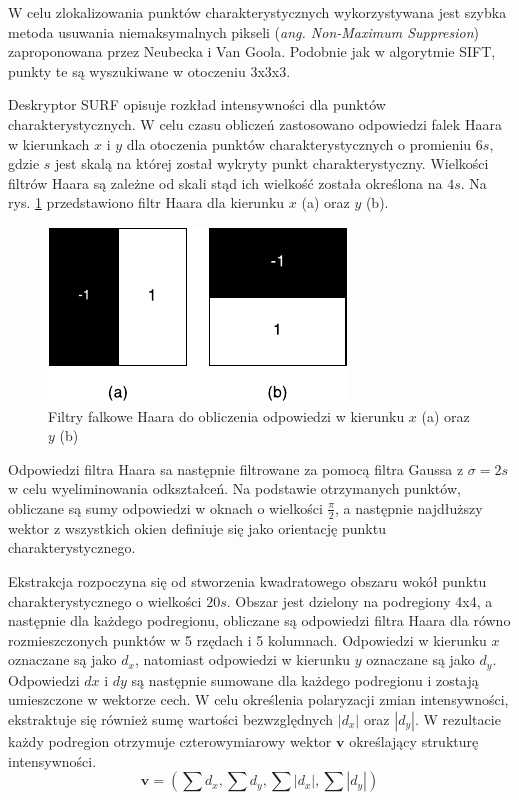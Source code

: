 W celu zlokalizowania punktów charakterystycznych wykorzystywana jest szybka metoda usuwania niemaksymalnych pikseli (\emph{ang. Non-Maximum Suppresion}) zaproponowana przez Neubecka i Van Goola\cite{NEUBECK06}. Podobnie jak w algorytmie SIFT, punkty te są wyszukiwane w otoczeniu 3x3x3.

Deskryptor SURF opisuje rozkład intensywności dla punktów charakterystycznych. W celu czasu obliczeń zastosowano odpowiedzi falek Haara w kierunkach $x$ i $y$ dla otoczenia punktów charakterystycznych o promieniu $6s$, gdzie $s$ jest skalą na której został wykryty punkt charakterystyczny. Wielkości filtrów Haara są zależne od skali stąd ich wielkość została określona na $4s$. Na rys. \ref{fig:surf-haar-wavelet} przedstawiono filtr Haara dla kierunku $x$ (a) oraz $y$ (b).

\begin{figure}[h]
	\centering
	\includegraphics[scale=1.5]{graphics/01_podstawy_teoretyczne/surf-haar-wavelet.pdf}
	\caption{Filtry falkowe Haara do obliczenia odpowiedzi w kierunku $x$ (a) oraz $y$ (b) \cite{BAY08}}
	\label{fig:surf-haar-wavelet}
\end{figure}

Odpowiedzi filtra Haara sa następnie filtrowane za pomocą filtra Gaussa z $\sigma = 2s$ w celu wyeliminowania odkształceń. Na podstawie otrzymanych punktów, obliczane są sumy odpowiedzi w oknach o wielkości $\frac{\pi}{2}$, a następnie najdłuższy wektor z wszystkich okien definiuje się jako orientację punktu charakterystycznego.

Ekstrakcja rozpoczyna się od stworzenia kwadratowego obszaru wokół punktu charakterystycznego o wielkości $20s$. Obszar jest dzielony na podregiony 4x4, a następnie dla każdego podregionu, obliczane są odpowiedzi filtra Haara dla równo rozmieszczonych punktów w 5 rzędach i 5 kolumnach. Odpowiedzi  w kierunku $x$ oznaczane są jako $d_x$, natomiast odpowiedzi w kierunku $y$ oznaczane są jako $d_y$. Odpowiedzi $dx$ i $dy$ są następnie sumowane dla każdego podregionu i zostają umieszczone w wektorze cech. W celu określenia polaryzacji zmian intensywności, ekstraktuje się również sumę wartości bezwzględnych $|d_x|$ oraz $|d_y|$. W rezultacie każdy podregion otrzymuje czterowymiarowy wektor $\boldsymbol{v}$ określający strukturę intensywności.
\begin{equation} 
\label{surf_v_vector} 
\boldsymbol{v} = (\sum{d_x}, \sum{d_y}, \sum{|d_x|}, \sum{|d_y|})
\end{equation}

